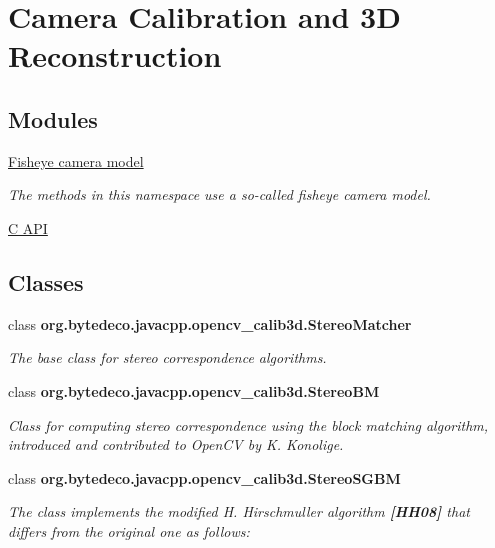 \hypertarget{group__calib3d}{}\section{Camera Calibration and 3D Reconstruction}
\label{group__calib3d}
\subsection*{Modules}
\begin{DoxyCompactItemize}
\item 
\hyperlink{group__calib3d__fisheye}{Fisheye camera model}
\begin{DoxyCompactList}\small\item\em The methods in this namespace use a so-\/called fisheye camera model. \end{DoxyCompactList}\item 
\hyperlink{group__calib3d__c}{C A\+PI}
\end{DoxyCompactItemize}
\subsection*{Classes}
\begin{DoxyCompactItemize}
\item 
class {\bfseries org.\+bytedeco.\+javacpp.\+opencv\+\_\+calib3d.\+Stereo\+Matcher}
\begin{DoxyCompactList}\small\item\em The base class for stereo correspondence algorithms. \end{DoxyCompactList}\item 
class {\bfseries org.\+bytedeco.\+javacpp.\+opencv\+\_\+calib3d.\+Stereo\+BM}
\begin{DoxyCompactList}\small\item\em Class for computing stereo correspondence using the block matching algorithm, introduced and contributed to Open\+CV by K. Konolige. \end{DoxyCompactList}\item 
class {\bfseries org.\+bytedeco.\+javacpp.\+opencv\+\_\+calib3d.\+Stereo\+S\+G\+BM}
\begin{DoxyCompactList}\small\item\em The class implements the modified H. Hirschmuller algorithm {\bfseries [H\+H08]} that differs from the original one as follows\+: \end{DoxyCompactList}\end{DoxyCompactItemize}
